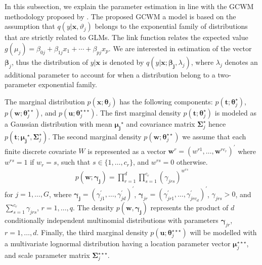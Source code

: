 \documentclass[11pt,letterpaper]{article}
\numberwithin{equation}{section}
\numberwithin{equation}{section}
\numberwithin{equation}{section}
\begin{document}
In this subsection, we explain the parameter estimation in line with the GCWM methodology proposed by \cite{Ingrassia+Punzo+Vittadini+Minotti:2015}. The proposed GCWM a model is based on the assumption that $q(y|\bm{x},\vartheta_j)$ belongs to the exponential family of distributions that are strictly related to GLMs. The link function relates the expected value $g(\mu_j)= \beta_{0j} + \beta_{1j} x_{1}+ \cdots+\beta_{pj} x_{p}$. We are interested in estimation of the vector $\bm \beta_j$, thus the distribution of $y|\bm{x}$ is denoted by $q(y|\bm{x}; \bm{\beta_j}, \lambda_j)$, where $\lambda_j$ denotes an additional parameter to account for when a distribution belong to a two-parameter exponential family.

The marginal distribution $p(\bm{x}; \bm \theta_j)$ has the following components: $p(\bm{t}; \bm \theta_j^{\star})$, $p(\bm{w}; \bm \theta_j^{\star\star})$, and $p(\bm{u};\bm \theta_{j}^{\star\star\star})$. The first marginal density $p(\bm{t}; \bm \theta_j^{\star})$ is modeled as a  Gaussian distribution with mean $\bm {\mu_j}^{\star}$ and covariance matrix $\bm \Sigma_j^{\star}$ hence $p(\bm t; \bm {\mu_j}^{\star}, \bm \Sigma_j^{\star})$. The second marginal density $p(\bm{w};\bm \theta_{j}^{\star\star})$ we assume that each finite discrete covariate $W$ is represented as a vector $\bm{w}^r=(w^{r1},\ldots,\bm{w}^{rc_r})^{'}$ where $w^{rs}=1$ if $w_r = s$, such that $s\in\{1, \ldots, c_r\}$, %
and $w^{rs}=0$ otherwise.
\begin{align}
p(\bm {w}; \bm {\gamma_j})=\prod_{r=1}^{d}\prod_{s=1}^{c_r}(\gamma_{jrs} )^{w^{rs}}
\label{eq31}
\end{align}
for $j=1, \ldots, G$, where $\bm {\gamma_j}=(\gamma_{j1}^{'}, \ldots, \gamma_{jd}^{'})^{'}$, $\bm \gamma_{jr}=(\gamma_{jr1}^{'}, \ldots, \gamma_{jrc_d}^{'})^{'}$, $\gamma_{jrs} > 0$, and  $\sum_{s=1}^{c_r}\gamma_{jrs}$, $r=1,\ldots,q$. The density $p(\bm {w}, \bm{\gamma_j})$ represents the product of $d$ conditionally independent multinomial distributions with parameters $\bm{\gamma}_{jr}$, $r=1,\ldots, d$. Finally, the third marginal density $p(\bm{u};\bm \theta_{j}^{\star\star\star})$ will be modelled with a multivariate lognormal distribution having a location parameter vector $ \bm \mu_j^{\star\star\star}$, and scale parameter matrix $\bm \Sigma_j^{\star\star\star} $.
\end{document}
